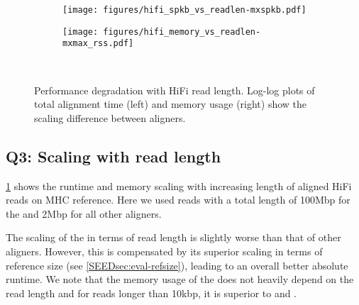 \begin{figure}[t]
	\begin{subfigure}{.49\textwidth}
	  \centering
	  \texttt{[image: figures/hifi\_spkb\_vs\_readlen-mxspkb.pdf]}
	\end{subfigure}%
	\begin{subfigure}{.45\textwidth}
	  \centering
	  \texttt{[image: figures/hifi\_memory\_vs\_readlen-mxmax\_rss.pdf]}
	\end{subfigure}~\hspace{1em} \caption[Performance scaling with query length
  (long reads)]{Performance degradation with HiFi read length. Log-log plots of
  total alignment time (left) and memory usage (right) show the scaling
  difference between aligners.}
	\label{SEEDfig:hifi_scaling_with_readlen}
  \end{figure}

\subsection{Q3: Scaling with read length}

\cref{SEEDfig:hifi_scaling_with_readlen} shows the runtime and memory scaling with
increasing length of aligned HiFi reads on MHC reference. Here we used reads
with a total length of 100Mbp for the \seedh and 2Mbp for all other aligners.

The scaling of the \seedh in terms of read length is slightly worse than that of
other aligners. However, this is compensated by its superior scaling in terms of
reference size (see \cref{SEEDsec:eval-refsize}), leading to an overall better
absolute runtime. We note that the memory usage of the \seedh does not heavily
depend on the read length and for reads longer than 10kbp, it is superior to
\graphaligner and \vargas.

